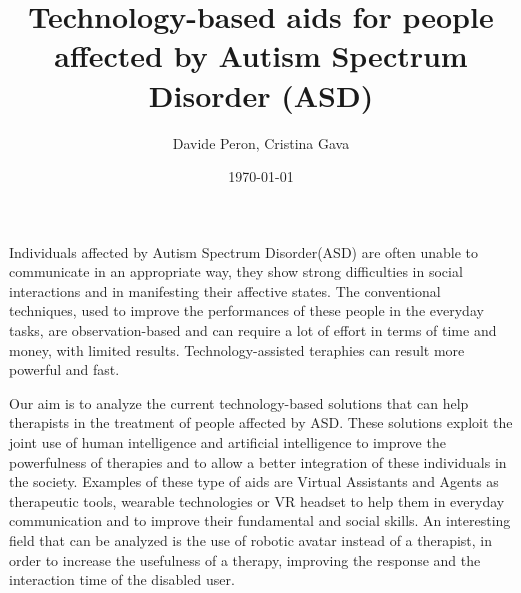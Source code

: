 \documentclass[paper=a4, fontsize=11pt]{scrartcl} %
\title{
\normalfont \normalsize
\huge Technology-based aids for people affected by Autism Spectrum Disorder (ASD)  \\ %
}
\author{Davide Peron, Cristina Gava}
\date{\today} %
\numberwithin{equation}{section} %
\numberwithin{figure}{section} %
\numberwithin{table}{section} %
\begin{document}
\maketitle %

Individuals affected by Autism Spectrum Disorder(ASD) are often unable to communicate in an
appropriate way, they show strong difficulties in social interactions and in manifesting their affective
states.
The conventional techniques, used to improve the performances of these people in the
everyday tasks, are observation-based and can require a lot of effort in terms of time and money, with limited
results.
Technology-assisted teraphies can result more powerful and fast.

Our aim is to analyze the current technology-based solutions that can help therapists in the treatment
of people affected by ASD.
These solutions exploit the joint use of human intelligence and artificial intelligence to improve
the powerfulness of therapies and to allow a better integration of these individuals in the society.
Examples of these type of aids are Virtual Assistants and Agents as therapeutic tools,
wearable technologies or VR headset to help them in everyday communication and to improve their
fundamental and social skills.
An interesting field that can be analyzed is the use of robotic avatar instead of a therapist, in order to increase
the usefulness of a therapy, improving the response and the interaction time of the disabled user.
\end{document}
